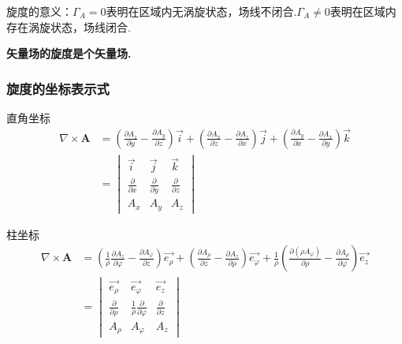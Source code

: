 \documentclass[12pt, UTF8, AutoFakeBold]{ctexart} %
\begin{document}
旋度的意义：$\varGamma_A = 0$表明在区域内无涡旋状态，场线不闭合.$\varGamma_A \neq 0$表明在区域内存在涡旋状态，场线闭合.

\textbf{矢量场的旋度是个矢量场.}
\subsubsection{旋度的坐标表示式}
直角坐标
\begin{align*}
    \nabla \times \boldsymbol{A} &=
    \left(\frac{\partial A_z}{\partial y} - \frac{\partial A_y}{\partial z}\right)\vec{i}
    + \left(\frac{\partial A_x}{\partial z} - \frac{\partial A_z}{\partial x}\right)\vec{j}
    + \left(\frac{\partial A_y}{\partial x} - \frac{\partial A_x}{\partial y}\right)\vec{k}\\
    &=
    \begin{vmatrix}
        \vec{i} & \vec{j} & \vec{k}\\
        \frac{\partial}{\partial x} & \frac{\partial}{\partial y} & \frac{\partial}{\partial z}\\
        A_x & A_y & A_z
    \end{vmatrix}
\end{align*}

柱坐标
\begin{align*}
    \nabla \times \boldsymbol{A} &=
    \left(\frac{1}{\rho}\frac{\partial A_z}{\partial \varphi} - \frac{\partial A_\varphi}{\partial z}\right)\vec{e_\rho}
    + \left(\frac{\partial A_\rho}{\partial z} - \frac{\partial A_z}{\partial \rho}\right)\vec{e_\varphi}
    + \frac{1}{\rho}\left(\frac{\partial(\rho A_\varphi)}{\partial \rho} - \frac{\partial A_\rho}{\partial \varphi}\right)\vec{e_z}\\
    &=
    \begin{vmatrix}
        \vec{e_\rho} & \vec{e_\varphi} & \vec{e_z}\\
        \frac{\partial}{\partial \rho} & \frac{1}{\rho} \frac{\partial}{\partial \varphi} & \frac{\partial}{\partial z}\\
        A_\rho & A_\varphi & A_z
    \end{vmatrix}
\end{align*}
\end{document}
